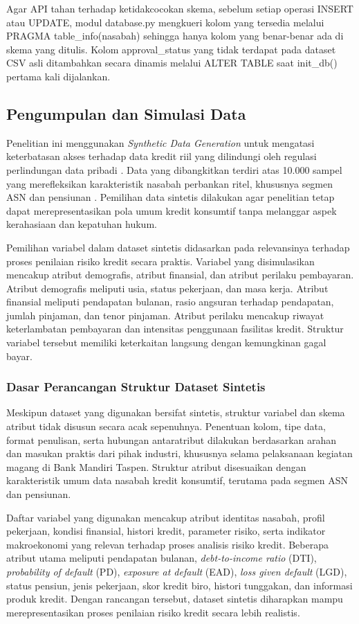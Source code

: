 Agar API tahan terhadap ketidakcocokan skema, sebelum setiap operasi INSERT atau UPDATE, modul database.py mengkueri kolom yang tersedia melalui PRAGMA table\_info(nasabah) sehingga hanya kolom yang benar-benar ada di skema yang ditulis. Kolom approval\_status yang tidak terdapat pada dataset CSV asli ditambahkan secara dinamis melalui ALTER TABLE saat init\_db() pertama kali dijalankan.

\subsection{Pengumpulan dan Simulasi Data}
Penelitian ini menggunakan \textit{Synthetic Data Generation} untuk mengatasi keterbatasan akses terhadap data kredit riil yang dilindungi oleh regulasi perlindungan data pribadi \cite{fca2024synthetic}. Data yang dibangkitkan terdiri atas 10.000 sampel yang merefleksikan karakteristik nasabah perbankan ritel, khususnya segmen ASN dan pensiunan \cite{sarjono2025adaptive}. Pemilihan data sintetis dilakukan agar penelitian tetap dapat merepresentasikan pola umum kredit konsumtif tanpa melanggar aspek kerahasiaan dan kepatuhan hukum.

Pemilihan variabel dalam dataset sintetis didasarkan pada relevansinya terhadap proses penilaian risiko kredit secara praktis. Variabel yang disimulasikan mencakup atribut demografis, atribut finansial, dan atribut perilaku pembayaran. Atribut demografis meliputi usia, status pekerjaan, dan masa kerja. Atribut finansial meliputi pendapatan bulanan, rasio angsuran terhadap pendapatan, jumlah pinjaman, dan tenor pinjaman. Atribut perilaku mencakup riwayat keterlambatan pembayaran dan intensitas penggunaan fasilitas kredit. Struktur variabel tersebut memiliki keterkaitan langsung dengan kemungkinan gagal bayar.

\subsubsection{Dasar Perancangan Struktur Dataset Sintetis}
Meskipun dataset yang digunakan bersifat sintetis, struktur variabel dan skema atribut tidak disusun secara acak sepenuhnya. Penentuan kolom, tipe data, format penulisan, serta hubungan antaratribut dilakukan berdasarkan arahan dan masukan praktis dari pihak industri, khususnya selama pelaksanaan kegiatan magang di Bank Mandiri Taspen. Struktur atribut disesuaikan dengan karakteristik umum data nasabah kredit konsumtif, terutama pada segmen ASN dan pensiunan.

Daftar variabel yang digunakan mencakup atribut identitas nasabah, profil pekerjaan, kondisi finansial, histori kredit, parameter risiko, serta indikator makroekonomi yang relevan terhadap proses analisis risiko kredit. Beberapa atribut utama meliputi pendapatan bulanan, \textit{debt-to-income ratio} (DTI), \textit{probability of default} (PD), \textit{exposure at default} (EAD), \textit{loss given default} (LGD), status pensiun, jenis pekerjaan, skor kredit biro, histori tunggakan, dan informasi produk kredit. Dengan rancangan tersebut, dataset sintetis diharapkan mampu merepresentasikan proses penilaian risiko kredit secara lebih realistis.

